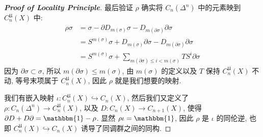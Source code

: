 \begin{proof}[{\bf Proof of Locality Principle}]
        最后验证 $\rho$ 确实将 $C_n(\Delta^n)$ 中的元素映到 $C^{\mathfrak{U}}_n(X)$ 中:
        \begin{align*}
            \rho\sigma &= \sigma - \partial D_{m(\sigma)}\sigma - D_{m(\partial\sigma)}\partial\sigma \\
            &= S^{m(\sigma)}\sigma + D_{m(\sigma)}\partial\sigma - D_{m(\partial\sigma)}\partial\sigma \\
            &= S^{m(\sigma)}\sigma + \sum_{m(\partial\sigma) \leq i < m(\sigma)}TS^i\partial\sigma 
        \end{align*}
        因为 $\partial\sigma\subset\sigma$, 所以 $m(\partial\sigma)\leq m(\sigma)$, 由 $m(\sigma)$ 的定义以及 $T$ 保持 $C^{\mathfrak{U}}_n(X)$ 不动,
        等号末项属于 $C^{\mathfrak{U}}_n(X)$, 因此 $\rho$ 就是我们想要的映射.

         我们有嵌入映射 $\iota:C^{\mathfrak{U}}_n(X)\hookrightarrow C_n(X)$, 然后我们又定义了 $\rho:C_n(\Delta^n)\rightarrow C^{\mathfrak{U}}_n(X)$, 
        以及 $D:C_n(X)\rightarrow C_{n+1}(X)$, 使得 $\partial D + D\partial = \mathbbm{1} - \rho$. 显然 $\rho\iota = \mathbbm{1}$, 因此 $\rho$ 是 $\iota$ 的同伦逆, 
        也即 $C^{\mathfrak{U}}_n(X)\hookrightarrow C_n(X)$ 诱导了同调群之间的同构.
    \end{proof}

    

